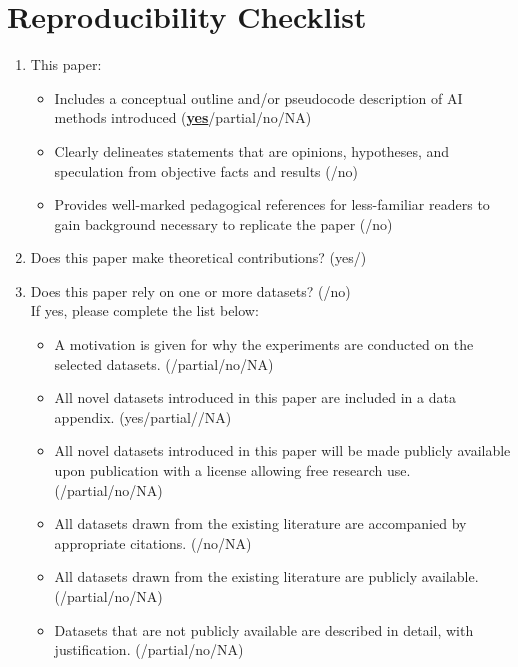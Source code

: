 \section{Reproducibility Checklist}

\begin{enumerate}
    \item This paper:
    \begin{itemize}
        \item Includes a conceptual outline and/or pseudocode description of AI methods introduced (\textbf{\underline{yes}}/partial/no/NA)
        \item Clearly delineates statements that are opinions, hypotheses, and speculation from objective facts and results (/no)
        \item Provides well-marked pedagogical references for less-familiar readers to gain background necessary to replicate the paper (/no)
    \end{itemize}

    \item Does this paper make theoretical contributions? (yes/) \\


    \item Does this paper rely on one or more datasets? (/no) \\
    If yes, please complete the list below:
    \begin{itemize}
        \item A motivation is given for why the experiments are conducted on the selected datasets. (/partial/no/NA)
        \item All novel datasets introduced in this paper are included in a data appendix. (yes/partial//NA)
        \item All novel datasets introduced in this paper will be made publicly available upon publication with a license allowing free research use. (/partial/no/{NA})
        \item All datasets drawn from the existing literature are accompanied by appropriate citations. (/no/NA)
        \item All datasets drawn from the existing literature are publicly available. (/partial/no/NA)
        \item Datasets that are not publicly available are described in detail, with justification. (/partial/no/NA)
    \end{itemize}


\end{enumerate}
